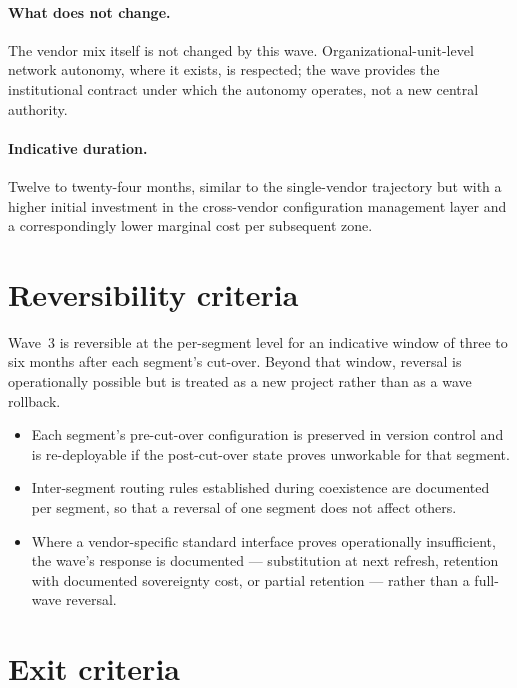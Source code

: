 \paragraph{What does not change.} The vendor mix itself is not
changed by this wave. Organizational-unit-level network autonomy,
where it exists, is respected; the wave provides the institutional
contract
under which the autonomy operates, not a new central authority.

\paragraph{Indicative duration.} Twelve to twenty-four months,
similar to the single-vendor trajectory but with a higher initial
investment in the cross-vendor configuration management layer and
a correspondingly lower marginal cost per subsequent zone.

\section{Reversibility criteria}
\label{sec:w3-reversibility}

Wave~3 is reversible at the per-segment level for an indicative
window of three to six months after each segment's cut-over.
Beyond that window, reversal is operationally possible but is
treated as a new project rather than as a wave rollback.

\begin{itemize}[leftmargin=1.5em,nosep]
  \item Each segment's pre-cut-over configuration is preserved in
    version control and is re-deployable if the post-cut-over
    state proves unworkable for that segment.
  \item Inter-segment routing rules established during coexistence
    are documented per segment, so that a reversal of one segment
    does not affect others.
  \item Where a vendor-specific standard interface proves
    operationally insufficient, the wave's response is documented
    --- substitution at next refresh, retention with documented
    sovereignty cost, or partial retention --- rather than a
    full-wave reversal.
\end{itemize}

\section{Exit criteria}
\label{sec:w3-exit}

